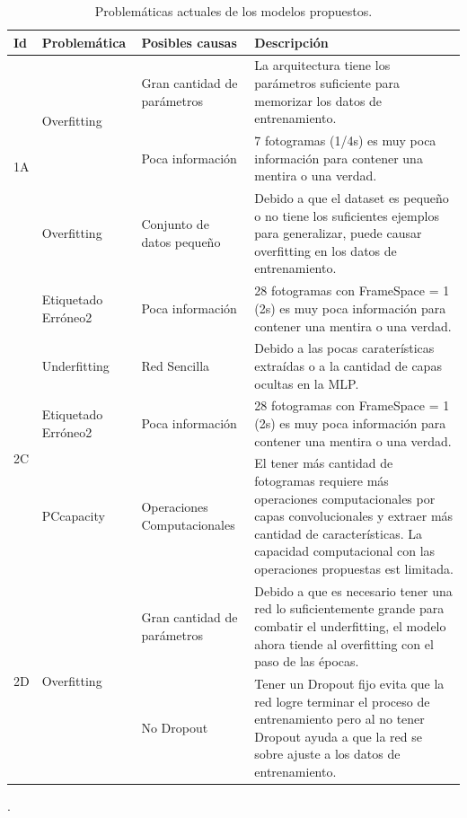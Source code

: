 \begin{onehalfspacing}
\begin{table}[p!]
\centering
    \begin{tabular}{|p{1cm}|p{3cm}|p{3cm}|p{7cm}|}
        \hline 
        Id & Problemática & Posibles causas & Descripción\tabularnewline
        \hline 
        \hline 
        \multirow{3}{*}{1A} & \multirow{2}{*}{Overfitting} & Gran cantidad de parámetros & La arquitectura tiene los parámetros suficiente para memorizar los
        datos de entrenamiento.\tabularnewline
        \cline{2-4} \cline{3-4} \cline{4-4} 
         & Etiquetado Erróneo & Poca información  & 7 fotogramas (1/4s) es muy poca información para contener una mentira
        o una verdad.\tabularnewline
        \hline 
        \multirow{2}{*}{1B} & Overfitting & Conjunto de datos pequeño & Debido a que el dataset es pequeño o no tiene los suficientes ejemplos
        para generalizar, puede causar overfitting en los datos de entrenamiento.\tabularnewline
        \cline{2-4} \cline{3-4} \cline{4-4} 
         & Etiquetado Erróneo2 & Poca información  & 28 fotogramas con FrameSpace = 1 (2s) es muy poca información para contener
        una mentira o una verdad.\tabularnewline
        \hline 
        \multirow{3}{*}{2C} & Underfitting & Red Sencilla & Debido a las pocas caraterísticas extraídas o a la cantidad de capas
        ocultas en la MLP.\tabularnewline
        \cline{2-4} \cline{3-4} \cline{4-4} 
         & Etiquetado Erróneo2 & Poca información  & 28 fotogramas con FrameSpace = 1 (2s) es muy poca información para contener
        una mentira o una verdad.\tabularnewline
        \cline{2-4} \cline{3-4} \cline{4-4} 
         & PCcapacity & Operaciones Computacionales & El tener más cantidad de fotogramas requiere más operaciones computacionales
        por capas convolucionales y extraer más cantidad de características.
        La capacidad computacional con las operaciones propuestas est limitada.\tabularnewline
        \hline 
        \multirow{2}{*}{2D} & \multirow{2}{*}{Overfitting} & Gran cantidad de parámetros & Debido a que es necesario tener una red lo suficientemente grande
        para combatir el underfitting, el modelo ahora tiende al overfitting
        con el paso de las épocas.\tabularnewline
        \cline{3-4} \cline{4-4} 
         &  & No Dropout & Tener un Dropout fijo evita que la red logre terminar el proceso de
        entrenamiento pero al no tener Dropout ayuda a que la red se sobre
        ajuste a los datos de entrenamiento.\tabularnewline
        \hline 
    \end{tabular}
    \caption{Problemáticas actuales de los modelos propuestos.}.
    \label{tab:TablaProblematicas3DLargeFramesMultiChannels}
\end{table}


\end{onehalfspacing}
